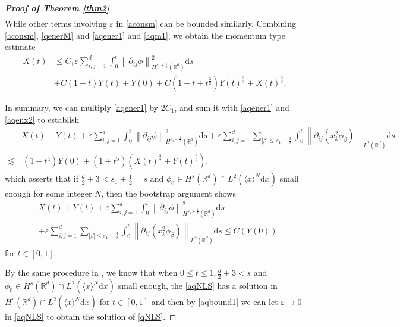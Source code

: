 \documentclass[10pt,twoside,a4paper]{article}
\numberwithin{equation}{section}\allowdisplaybreaks
\def\leq{\leqslant}
\begin{document}
\begin{proof}[\textbf{Proof of Theorem \ref{thm2}}]
\begin{align}
\end{align}
While other terms involving $\varepsilon$ in \eqref{aconsm} can be bounded similarly. Combining  \eqref{aconsm}, \eqref{qenerM} and \eqref{aqener1} and \eqref{aqm1}, we obtain the momentum type estimate
\begin{align} \label{aqenerM}
		X(t)&	\leq C_1\varepsilon  \sum_{i,j=1}^d\int_0^t\left\| \partial_{ij}\phi\right\|_{H^{s_1+\frac 12}(\mathbb{R}^d)}^2 \mathrm{d} s\\
		&+ C (1+t)Y(t)+Y(0) + C(1+t+t^{\frac 32}) Y(t)^{\frac 32} + X(t)^{\frac 32}
		.\nonumber
\end{align}


In summary, we can multiply \eqref{aqener1} by $ 2C_1 $, and sum it  with \eqref{aqener1} and \eqref{aqenx2} to establish
\begin{align*} 
	&X(t)+Y(t) +\varepsilon  \sum_{i,j=1}^d\int_0^t\left\| \partial_{ij}\phi\right\|_{H^{s_1+\frac 12}(\mathbb{R}^d)}^2 \mathrm{d} s+\varepsilon\sum_{i,j=1}^d\sum_{|\beta| \leq s_1-\frac32}\int_0^t \left\| \partial_{ij}\left( x_k^2
	\phi_\beta\right)\right\|_{L^2(\mathbb{R}^d)}\mathrm{d}s \\
	\lesssim 	&\,\left(1+ t^4\right)	Y(0)  +	\left(1+ t^5 \right)\left(X(t)^{\frac 32} +Y(t)^{\frac 32}\right),  \nonumber
\end{align*}
which asserts that if  $  \frac d2 +3<s_1+\frac 12=s $ and 
$ \phi_0 \in H^{s} (\mathbb{R}^d) \cap L^2(\langle x\rangle^N \mathrm{d}x) $  small enough for some integer $ N $, then the bootstrap argument shows
\begin{align} \label{aqbound1}
&X(t)+Y(t) +\varepsilon  \sum_{i,j=1}^d\int_0^t\left\| \partial_{ij}\phi\right\|_{H^{s_1+\frac 12}(\mathbb{R}^d)}^2 \mathrm{d} s\nonumber\\
&+\varepsilon\sum_{i,j=1}^d\sum_{|\beta| \leq s_1-\frac32}\int_0^t \left\| \partial_{ij}\left( x_k^2
\phi_\beta\right)\right\|_{L^2(\mathbb{R}^d)}\mathrm{d}s  \leq C\left(	Y(0)\right)
\end{align}
for $ t\in[0,1] $.
 
 	By  the same procedure in \cite{kenig2004cauchy}, we know that when  $0\leq t\leq 1,  \frac{d}{2}+3<s $ and $ \phi_0 \in H^{s} (\mathbb{R}^d) \cap L^2(\langle x\rangle^N \mathrm{d}x) $  small enough,  the \eqref{aqNLS} has a solution  in $ H^{s} (\mathbb{R}^d) \cap L^2(\langle x\rangle^N \mathrm{d}x)$  for $ t \in [0,1] $ and then by \eqref{aqbound1} we  can let $ \varepsilon\rightarrow 0 $ in \eqref{aqNLS} to obtain the solution of \eqref{qNLS}. 
 	

\end{proof}
\end{document}
